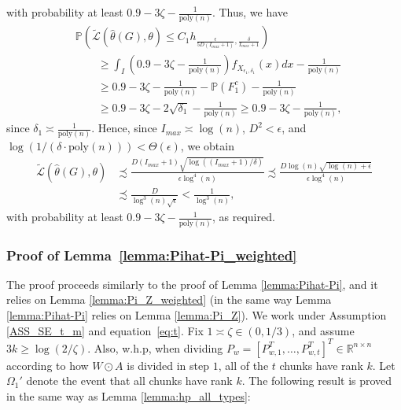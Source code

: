 \documentclass{article}
\newcommand{\thetahat}{\ensuremath{\widehat{\theta}}}
\begin{document}
with probability at least $0.9 - 3\zeta - \frac{1}{\mathrm{poly}(n)}$. Thus, we have
\begin{align*}
& \mathbb{P}\left(\widetilde{\mathcal{L}}\left(\thetahat(G), \theta\right) \leq C_1h_{\frac{\epsilon}{5D(I_{max} + 1)}, \frac{\delta}{I_{max} + 1}}\right) \\
%
&\qquad \geq \int_I\left(0.9 - 3\zeta - \frac{1}{\mathrm{poly}(n)}\right)f_{X_{\epsilon_1, \delta_1}}(x)dx - \frac{1}{\mathrm{poly}(n)}\\
& \qquad \geq 0.9 - 3\zeta - \frac{1}{\mathrm{poly}(n)} - \mathbb{P}(F_1^c) - \frac{1}{\mathrm{poly}(n)}\\
& \qquad \geq  0.9 - 3\zeta - 2\sqrt{\delta_1} - \frac{1}{\mathrm{poly}(n)} \geq 0.9 - 3\zeta - \frac{1}{\mathrm{poly}(n)},
\end{align*}
since $\delta_1 \asymp \frac{1}{\mathrm{poly}(n)}$. Hence, since $I_{max} \asymp \log(n)$, $D^2 < \epsilon$, and $\log(1/(\delta\cdot\mathrm{poly}(n))) < \Theta(\epsilon)$, we obtain
\begin{align*}
\widetilde{\mathcal{L}}\left(\thetahat(G), \theta\right) & \precsim \frac{D(I_{max} + 1)\sqrt{\log((I_{max} + 1)/\delta)}}{\epsilon\log^4(n)} \precsim \frac{D\log(n)\sqrt{\log(n) + \epsilon}}{\epsilon\log^4(n)} \\
%
& \precsim \frac{D}{\log^3(n)\sqrt{\epsilon}} < \frac{1}{\log^3(n)},
\end{align*}
with probability at least $0.9 - 3\zeta - \frac{1}{\mathrm{poly}(n)}$, as required.


\subsubsection{Proof of Lemma~\ref{lemma:Pihat-Pi_weighted}}
\label{AppLemPihatWt}

The proof proceeds similarly to the proof of Lemma \ref{lemma:Pihat-Pi}, and it relies on Lemma \ref{lemma:Pi_Z_weighted} (in the same way Lemma \ref{lemma:Pihat-Pi} relies on Lemma \ref{lemma:Pi_Z}).
We work under Assumption \ref{ASS_SE_t_m} and equation~\eqref{eq:t}. Fix $ 1 \asymp \zeta \in (0, 1/3)$, and assume $3k \geq \log(2/\zeta)$. Also, w.h.p, when dividing $P_w =[P_{w, 1}^T, \dots, P_{w, t}^T]^T \in \mathbb{R}^{n \times n}$ according to how $W \odot A$ is divided in step $1$, all of the $t$ chunks have rank $k$. Let $\Omega_1'$ denote the event that all chunks have rank $k$. The following result is proved in the same way as Lemma \ref{lemma:hp_all_types}:
\end{document}

